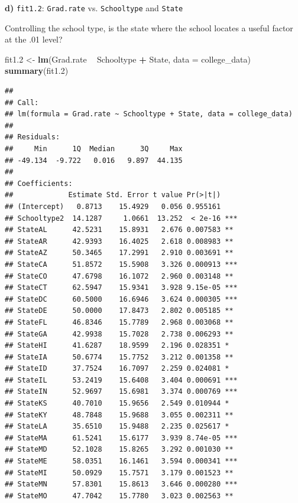 \documentclass[]{article}
\newenvironment{Shaded}{\begin{snugshade}}{\end{snugshade}}
\newcommand{\KeywordTok}[1]{\textcolor[rgb]{0.13,0.29,0.53}{\textbf{#1}}}
\newcommand{\DataTypeTok}[1]{\textcolor[rgb]{0.13,0.29,0.53}{#1}}
\newcommand{\DecValTok}[1]{\textcolor[rgb]{0.00,0.00,0.81}{#1}}
\newcommand{\StringTok}[1]{\textcolor[rgb]{0.31,0.60,0.02}{#1}}
\newcommand{\OperatorTok}[1]{\textcolor[rgb]{0.81,0.36,0.00}{\textbf{#1}}}
\newcommand{\NormalTok}[1]{#1}
\begin{document}
\textbf{d)} \texttt{fit1.2}: \texttt{Grad.rate} vs. \texttt{Schooltype}
and \texttt{State}

Controlling the school type, is the state where the school locates a
useful factor at the .01 level?

\begin{Shaded}
\begin{Highlighting}[]
\NormalTok{fit1.}\DecValTok{2}\NormalTok{ <-}\StringTok{ }\KeywordTok{lm}\NormalTok{(Grad.rate }\OperatorTok{~}\StringTok{ }\NormalTok{Schooltype }\OperatorTok{+}\StringTok{ }\NormalTok{State, }\DataTypeTok{data =}\NormalTok{ college_data)}
\KeywordTok{summary}\NormalTok{(fit1.}\DecValTok{2}\NormalTok{)}
\end{Highlighting}
\end{Shaded}

\begin{verbatim}
## 
## Call:
## lm(formula = Grad.rate ~ Schooltype + State, data = college_data)
## 
## Residuals:
##     Min      1Q  Median      3Q     Max 
## -49.134  -9.722   0.016   9.897  44.135 
## 
## Coefficients:
##             Estimate Std. Error t value Pr(>|t|)    
## (Intercept)   0.8713    15.4929   0.056 0.955161    
## Schooltype2  14.1287     1.0661  13.252  < 2e-16 ***
## StateAL      42.5231    15.8931   2.676 0.007583 ** 
## StateAR      42.9393    16.4025   2.618 0.008983 ** 
## StateAZ      50.3465    17.2991   2.910 0.003691 ** 
## StateCA      51.8572    15.5908   3.326 0.000913 ***
## StateCO      47.6798    16.1072   2.960 0.003148 ** 
## StateCT      62.5947    15.9341   3.928 9.15e-05 ***
## StateDC      60.5000    16.6946   3.624 0.000305 ***
## StateDE      50.0000    17.8473   2.802 0.005185 ** 
## StateFL      46.8346    15.7789   2.968 0.003068 ** 
## StateGA      42.9938    15.7028   2.738 0.006293 ** 
## StateHI      41.6287    18.9599   2.196 0.028351 *  
## StateIA      50.6774    15.7752   3.212 0.001358 ** 
## StateID      37.7524    16.7097   2.259 0.024081 *  
## StateIL      53.2419    15.6408   3.404 0.000691 ***
## StateIN      52.9697    15.6981   3.374 0.000769 ***
## StateKS      40.7010    15.9656   2.549 0.010944 *  
## StateKY      48.7848    15.9688   3.055 0.002311 ** 
## StateLA      35.6510    15.9488   2.235 0.025617 *  
## StateMA      61.5241    15.6177   3.939 8.74e-05 ***
## StateMD      52.1028    15.8265   3.292 0.001030 ** 
## StateME      58.0351    16.1461   3.594 0.000341 ***
## StateMI      50.0929    15.7571   3.179 0.001523 ** 
## StateMN      57.8301    15.8613   3.646 0.000280 ***
## StateMO      47.7042    15.7780   3.023 0.002563 ** 

\end{verbatim}
\end{document}
